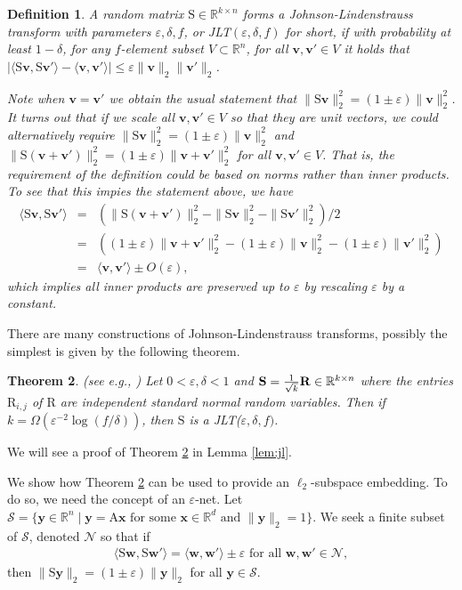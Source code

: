 \documentclass[11pt]{article}
\newtheorem{theorem}{Theorem}
\newtheorem{definition}[theorem]{Definition}
\newcommand{\mat}[1]{{\ensuremath{\bm{\mathrm{#1}}}}}
\def\ve{{\mathbf v}}
\def\matA{\mat{A}}
\def\matR{\mat{R}}
\def\matS{\mat{S}}
\def\w{{\mathbf{w}}}
\def\frac#1#2{{#1\over #2}}
\def\x{{\mathbf x}}
\def\y{{\mathbf y}}
\newcommand{\eps}{\varepsilon}
\begin{document}
\begin{definition}
A random matrix $\matS \in \mathbb{R}^{k \times n}$ forms a Johnson-Lindenstrauss transform with parameters 
$\eps, \delta, f$, or JLT$(\eps, \delta, f)$ for short, if with probability at least $1-\delta$,
for any $f$-element subset $V \subset \mathbb{R}^n$, for all $\ve, \ve' \in V$ it holds that
$|\langle \matS \ve, \matS \ve' \rangle - \langle \ve, \ve' \rangle| \leq \eps \|\ve\|_2 \|\ve'\|_2$. 

Note when $\ve = \ve'$ 
we obtain the usual statement that $\|\matS \ve\|_2^2 = (1 \pm \eps)\|\ve\|_2^2$. It turns out that if we scale all $\ve, \ve' \in V$ so that they are unit vectors, we could alternatively require 
$\|\matS \ve\|_2^2 = (1 \pm \eps)\|\ve\|_2^2$ and $\|\matS (\ve + \ve')\|_2^2 = (1 \pm \eps) \|\ve + \ve'\|_2^2$ for all $\ve, \ve' \in V$. That is, the requirement of the definition could be based on norms rather than inner products. To see that this
impies the statement above, we have 
\begin{eqnarray*}
\langle \matS \ve, \matS \ve' \rangle
& = & (\|\matS(\ve + \ve')\|_2^2 - \|\matS \ve\|_2^2 - \|\matS \ve'\|_2^2)/2\\
& = & ((1\pm \eps)\|\ve + \ve'\|_2^2 - (1 \pm \eps)\|\ve\|_2^2 - (1 \pm \eps)\|\ve'\|_2^2)\\
& = & \langle \ve, \ve' \rangle \pm O(\eps), 
\end{eqnarray*}
which implies all inner products are preserved up to $\eps$ by rescaling $\eps$ by a constant. 
\end{definition}

There are many constructions of Johnson-Lindenstrauss transforms, possibly the simplest is given by
the following theorem. 

\begin{theorem}\label{thm:normals} (see e.g., \cite{IM98})
Let $0 < \eps, \delta < 1$ and 
$\matS = \frac{1}{\sqrt{k}} \matR \in \mathbb{R}^{k \times n}$ where the entries
$\matR_{i,j}$ of $\matR$ are independent standard normal random variables. 
Then if $k = \Omega(\eps^{-2} \log (f/\delta))$,
then $\matS$ is a JLT($\eps, \delta, f)$. 
\end{theorem}
We will see a proof of Theorem \ref{thm:normals} in Lemma \ref{lem:jl}. 

We show how Theorem \ref{thm:normals} can be used to provide an $\ell_2$-subspace embedding. To do so, we need
the concept of an $\eps$-net. Let 
$\mathcal{S} = \{\y \in \mathbb{R}^n \mid \y = \matA \x \textrm{ for some } \x \in \mathbb{R}^d \textrm{ and } \|\y\|_2 = 1\}$.
We seek a finite subset of
$\mathcal{S}$, denoted $\mathcal{N}$ so that if 
\begin{eqnarray}\label{eqn:netProperty}
\langle \matS \w, \matS \w' \rangle = \langle \w, \w' \rangle \pm \eps \textrm{ for all } \w, \w' \in \mathcal{N},
\end{eqnarray}
then $\|\matS \y\|_2 = (1 \pm \eps)\|\y\|_2$ for all $\y \in \mathcal{S}$. 
\end{document}

